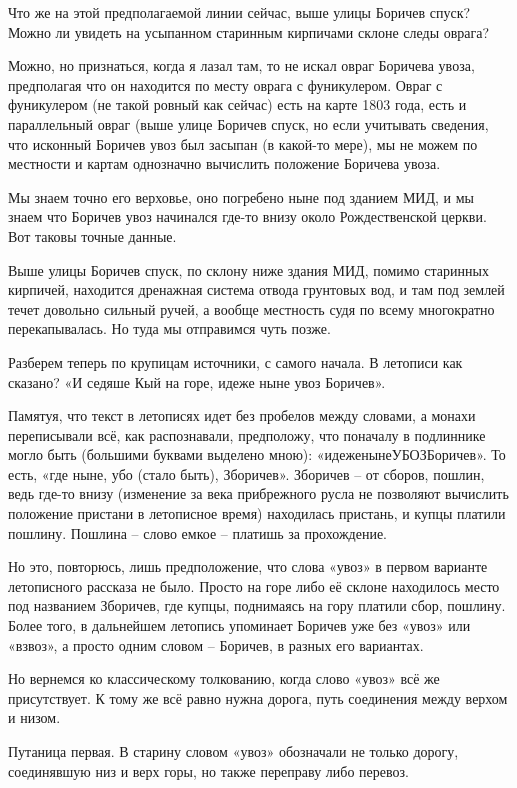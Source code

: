 Что же на этой предполагаемой линии сейчас, выше улицы Боричев спуск? Можно ли увидеть на усыпанном старинным кирпичами склоне следы оврага?

Можно, но признаться, когда я лазал там, 
то не искал овраг Боричева увоза, предполагая что он находится по месту оврага с фуникулером. Овраг с фуникулером (не такой ровный как сейчас) есть на карте 1803 года, есть и параллельный овраг (выше улице Боричев спуск, но если учитывать сведения, что исконный Боричев увоз был засыпан (в какой-то мере), мы не можем по местности и картам однозначно вычислить положение Боричева увоза.

Мы знаем точно его верховье, оно погребено ныне под зданием МИД, и мы знаем что Боричев увоз начинался где-то внизу около Рождественской церкви. Вот таковы точные данные.

Выше улицы Боричев спуск, по склону ниже здания МИД, помимо старинных кирпичей, находится дренажная система отвода грунтовых вод, и там под землей течет довольно сильный ручей, а вообще местность судя по всему многократно перекапывалась. Но туда мы отправимся чуть позже.

Разберем теперь по крупицам источники, с самого начала. В летописи как сказано? «И седяше Кый на горе, идеже ныне увоз Боричев».

Памятуя, что текст в летописях идет без пробелов между словами, а монахи переписывали всё, как распознавали, предположу, что поначалу в подлиннике могло быть (большими буквами выделено мною): «идеженынеУБОЗБоричев». То есть, «где ныне, убо (стало быть), Зборичев». Зборичев – от сборов, пошлин, ведь где-то внизу (изменение за века прибрежного русла не позволяют вычислить положение пристани в летописное время) находилась пристань, и купцы платили пошлину. Пошлина – слово емкое – платишь за прохождение.

Но это, повторюсь, лишь предположение, 
что слова «увоз» в первом варианте летописного рассказа не было. Просто на горе либо её склоне находилось место под названием Зборичев, где купцы, поднимаясь на гору платили сбор, пошлину. Более того, в дальнейшем летопись упоминает Боричев уже без «увоз» или «взвоз», а просто одним словом – Боричев, в разных его вариантах.

Но вернемся ко классическому толкованию, когда слово «увоз» всё же присутствует. К тому же всё равно нужна дорога, путь соединения между верхом и низом.

Путаница первая. В старину словом «увоз»
обозначали не только дорогу, соединявшую низ и верх горы, но также переправу либо перевоз. 


